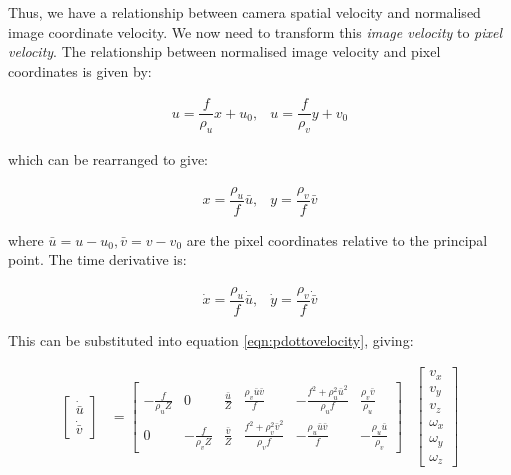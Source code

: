 \documentclass{UoNMCHA}
\numberwithin{equation}{section}
\begin{document}
Thus, we have a relationship between camera spatial velocity and normalised image coordinate velocity. We now need to transform this \textit{image velocity} to \textit{pixel velocity}. The relationship between normalised image velocity and pixel coordinates is given by: 

\begin{equation}
	\begin{aligned}
		u = \dfrac{f}{\rho_{u}}x + u_{0} ,
		& u = \dfrac{f}{\rho_{v}}y + v_{0}
	\end{aligned}
\end{equation}

which can be rearranged to give:

\begin{equation}
	\begin{aligned}
		x = \dfrac{\rho_{u}}{f}\bar{u} ,
		& y = \dfrac{\rho_{v}}{f}\bar{v}
	\end{aligned}
\end{equation}

where $\bar{u} = u - u_0 , \bar{v} = v - v_0$ are the pixel coordinates relative to the principal point. The time derivative is:

\begin{equation}
	\begin{aligned}
		\dot{x} = \dfrac{\rho_{u}}{f}\dot{\bar{u}} ,
	  & \dot{y} = \dfrac{\rho_{v}}{f}\dot{\bar{v}}
	\end{aligned}
\end{equation}

This can be substituted into equation \ref{eqn:pdottovelocity}, giving:

\begin{equation}\label{eqn:ImageJacobiannormal}
\begin{aligned}
\begin{bmatrix}
	\dot{\bar{u}} \\
	\dot{\bar{v}}
\end{bmatrix}
& =
\begin{bmatrix}
-\frac{f}{\rho_{u} Z} & 0 & \frac{\bar{u}}{Z} & \frac{\rho_{v} \bar{u} \bar{v}}{f} & -\frac{f^{2}+\rho_{u}^{2} \bar{u}^{2}}{\rho_{u}f} & \frac{\rho_{v} \bar{v}}{\rho_{u}} \\

0 & -\frac{f}{\rho_{v} Z} & \frac{\bar{v}}{Z} & \frac{f^{2}+\rho_{v}^{2} \bar{v}^{2}}{\rho_{v} f} & -\frac{\rho_{u} \bar{u} \bar{v}}{f} & -\frac{\rho_{u} \bar{u}}{\rho_{v}}
\end{bmatrix}
&
\begin{bmatrix}
v_{x} \\
v_{y} \\
v_{z} \\
\omega_{x} \\
\omega_{y} \\
\omega_{z}
\end{bmatrix}
\end{aligned}
\end{equation}
\end{document}
